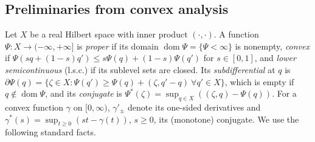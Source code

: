 \documentclass[11pt]{amsart}
\theoremstyle{definition}
\theoremstyle{remark}
\numberwithin{equation}{section}
\DeclareMathOperator{\dom}{dom}
\begin{document}
\subsection{Preliminaries from convex analysis}\label{ssec:prelim}
Let $X$ be a real Hilbert space with inner product $(\cdot,\cdot)$. A function $\Psi\colon X\to(-\infty,+\infty]$ is \emph{proper} if its domain $\dom\Psi=\{\Psi<\infty\}$ is nonempty, \emph{convex} if $\Psi(sq+(1-s)q')\le s\Psi(q)+(1-s)\Psi(q')$ for $s\in[0,1]$, and \emph{lower semicontinuous} (l.s.c.) if its sublevel sets are closed. Its \emph{subdifferential} at $q$ is $\partial\Psi(q)=\{\zeta\in X:\Psi(q')\ge\Psi(q)+(\zeta,q'-q)\ \forall q'\in X\}$, which is empty if $q\notin\dom\Psi$, and its \emph{conjugate} is $\Psi^*(\zeta)=\sup_{q\in X}((\zeta,q)-\Psi(q))$. For a convex function $\gamma$ on $[0,\infty)$, $\gamma'_\pm$ denote its one-sided derivatives and $\gamma^*(s)=\sup_{t\ge0}(st-\gamma(t))$, $s\ge0$, its (monotone) conjugate. We use the following standard facts.
\end{document}
